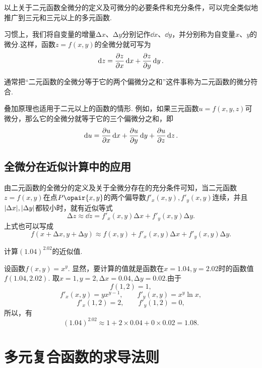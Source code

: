 以上关于二元函数全微分的定义及可微分的必要条件和充分条件，可以完全类似地推广到三元和三元以上的多元函数.

习惯上，我们将自变量的增量\(\increment x\)、\(\increment y\)分别记作\(\dd{x}\)、\(\dd{y}\)，并分别称为自变量\(x\)、\(y\)的微分.这样，函数\(z=f(x,y)\)的全微分就可写为\[
\dd{z}=\pdv{z}{x}\dd{x}+\pdv{z}{y}\dd{y}.
\]

通常把“二元函数的全微分等于它的两个偏微分之和”这件事称为二元函数的微分符合.

叠加原理也适用于二元以上的函数的情形.
例如，如果三元函数\(u = f(x,y,z)\)可微分，那么它的全微分就等于它的三个偏微分之和，即\[
\dd{u} = \pdv{u}{x} \dd{x} + \pdv{u}{y} \dd{y} + \pdv{u}{z} \dd{z}.
\]

\subsection{全微分在近似计算中的应用}
由二元函数的全微分的定义及关于全微分存在的充分条件可知，当二元函数\(z = f(x,y)\)在点\(P\opair{x,y}\)的两个偏导数\(f'_x(x,y),f'_y(x,y)\)连续，并且\(\abs{\Delta x},\abs{\Delta y}\)都较小时，就有近似等式\[
\increment z \approx \dd{z} = f'_x(x,y) \increment x + f'_y(x,y) \increment y.
\]上式也可以写成\[
f(x+\increment x,y+\increment y) \approx f(x,y) + f'_x(x,y) \increment x + f'_y(x,y) \increment y.
\]

\begin{example}
计算\((1.04)^{2.02}\)的近似值.
\begin{solution}
设函数\(f(x,y) = x^y\).
显然，要计算的值就是函数在\(x=1.04,y=2.02\)时的函数值\(f(1.04,2.02)\).
取\(x=1,y=2,\increment x=0.04,\increment y=0.02\).由于\[
f(1,2)=1,
\]\[
f'_x(x,y) = y x^{y-1}, \qquad f'_y(x,y) = x^y \ln x,
\]\[
f'_x(1,2) = 2, \qquad f'_y(1,2) = 0,
\]所以，有\[
(1.04)^{2.02} \approx 1 + 2 \times 0.04 + 0 \times 0.02 = 1.08.
\]
\end{solution}
\end{example}

\section{多元复合函数的求导法则}
